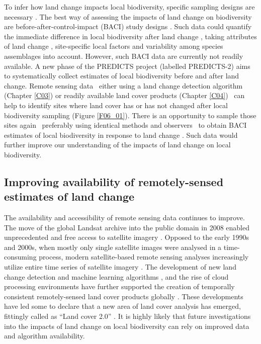 To infer how land change impacts local biodiversity, specific sampling designs are necessary \citep{DePalma2018}. The best way of assessing the impacts of land change on biodiversity are before-after-control-impact (BACI) study designs \citep{Cardinale2018,DePalma2018}. Such data could quantify the immediate difference in local biodiversity after land change \citep{Ratajczak2018}, taking attributes of land change \citep{Watson2014}, site-specific local factors \citep{Jung2016} and variability among species assemblages \citep{Dornelas2013,Franca2016} into account. However, such BACI data are currently not readily available. A new phase of the PREDICTS project (labelled PREDICTS-2) aims to systematically collect estimates of local biodiversity before and after land change. Remote sensing data \textendash\ either using a land change detection algorithm (Chapter \ref{C03}) or readily available land cover products (Chapter \ref{C04}) \textendash\ can help to identify sites where land cover has or has not changed after local biodiversity sampling (Figure \ref{F06_01}). There is an opportunity to sample those sites again \textendash\ preferably using identical methods and observers \textendash\ to obtain BACI estimates of local biodiversity in response to land change \citep{DePalma2018}. Such data would further improve our understanding of the impacts of land change on local biodiversity.

\subsection{Improving availability of remotely-sensed estimates of land change}
\label{C06_0404}

The availability and accessibility of remote sensing data continues to improve. The move of the global Landsat archive into the public domain in 2008 enabled unprecedented and free access to satellite imagery \citep{Wulder2015}. Opposed to the early 1990s and 2000s, when mostly only single satellite images were analysed in a time-consuming process, modern satellite-based remote sensing analyses increasingly utilize entire time series of satellite imagery \citep{Kennedy2014,Hermosilla2015a}. The development of new land change detection \citep{Coppin2004,Abercrombie2016,Zhu2017} and machine learning algorithms \citep{Maxwell2018}, and the rise of cloud processing environments \citep{Gorelick2017} have further supported the creation of temporally consistent remotely-sensed land cover products globally \citep{ESA2017,Hermosilla2018,Sulla-Menashe2019}. These developments have led some to declare that a new area of land cover analysis has emerged, fittingly called as “Land cover 2.0” \citep{Wulder2018}. It is highly likely that future investigations into the impacts of land change on local biodiversity can rely on improved data and algorithm availability.

